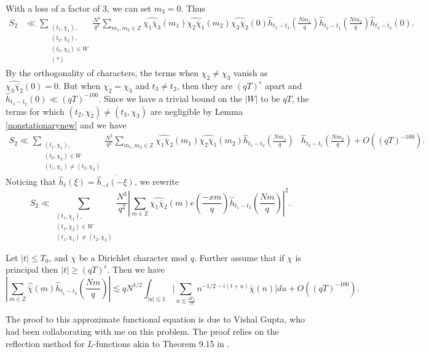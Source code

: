 With a loss of a factor of $3$, we can set $m_3=0$. Thus \begin{align*}
    S_2&\ll\sum_{\substack{(t_1,\chi_1),\\(t_2,\chi_2),\\(t_3,\chi_3)\in W \\ (*)}}
    \frac{N^3}{q^3}\sum_{m_1,m_2\in\mathbb{Z}}\widehat{{\chi_1{\overline{\chi}_3}}}(m_1)\widehat{\chi_2\overline{\chi}_1}(m_2)\widehat{\chi_3\overline{\chi}_2}(0) \hat{h}_{t_1-t_3}\left(\frac{Nm_1}{q}\right)\hat{h}_{t_2-t_1}\left(\frac{Nm_2}{q}\right)\hat{h}_{t_3-t_2}\left(0\right).
\end{align*}
By the orthogonality of characters, the terms when $\chi_2\neq \chi_3$ vanish as $\widehat{\chi_3\overline{\chi_2}}(0)=0.$ But when $\chi_2=\chi_3$ and $t_3\neq t_2$, then they are $(qT)^{\epsilon}$ apart and $\hat{h}_{t_3-t_2}(0)\ll (qT)^{-100}$. Since we have a trivial bound on the $|W|$ to be $qT$, 
 the terms for which $(t_2,\chi_2)\neq(t_3,\chi_3)$ are negligible by Lemma \ref{nonstationarynew} and we have \begin{align*}
	 S_2\ll\sum_{\substack{(t_1,\chi_1),\\(t_2,\chi_2)\in W \\ (t_1,\chi_1)\neq (t_2,\chi_2)}}
	\frac{N^3}{q^2}\sum_{m_1,m_2\in\mathbb{Z}}\widehat{{\chi_1{\overline{\chi}_2}}}(m_1)\widehat{\chi_2\overline{\chi}_1}(m_2)
	\hat{h}_{t_1-t_2}\left(\frac{Nm_1}{q}\right)&\hat{h}_{t_2-t_1}\left(\frac{Nm_2}{q}\right)+O((qT)^{-100}).
\end{align*}   
Noticing that $\hat{h}_t(\xi)=\overline{\hat{h}_{-t}(-\xi)}$, we rewrite \begin{equation} \label{S2clean}
    S_2 \ll\sum_{\substack{(t_1,\chi_1),\\(t_2,\chi_2)\in W \\ (t_1,\chi_1)\neq (t_2,\chi_2)}}
    \frac{N^3}{q^2}\left|\sum_{m \in \mathbb{Z}}\widehat{{\chi_1{\overline{\chi}_2}}}(m) e\left(\frac{-xm}{q}\right)
    \hat{h}_{t_1-t_2}\left(\frac{Nm}{q}\right)\right|^2.
\end{equation}
\begin{lemma}
    Let $|t|\leq T_0$, and $\chi$ be a Dirichlet character mod $q$. Further assume that if $\chi$ is principal then $|t|\geq (qT)^{\epsilon}$. Then we have \[
        \left|\sum_{m \in \mathbb{Z}}\hat{\bar{\chi}}(m)
        \hat{h}_{t_1-t_2}\left(\frac{Nm}{q}\right)\right|\lesssim qN^{1/2}\int_{|u|\lesssim 1}\Big|\sum_{n\lesssim \frac{qT_0}{N}}n^{-1/2-i(t+u)}\bar{\chi}(n)\Big| du + O((qT)^{-100}).
    \]
\end{lemma}
The proof to this approximate functional equation is due to Vishal Gupta, who had been collaborating with me on this problem. The proof relies on the reflection method for $L$-functions akin to Theorem 9.15 in \cite{iwaniec}. 

